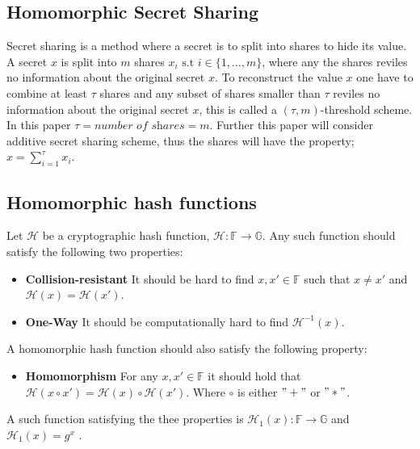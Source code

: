 \subsection*{Homomorphic Secret Sharing}
Secret sharing \cite{How_share_A_secret} is a method where a secret is to split  into shares to hide its value. A secret $x$ is split into $m$ shares $x_i \text{ s.t } i\in\{1,...,m\}$, where any the shares reviles no information about the original secret $x$. To reconstruct the value $x$ one have to combine at least $\tau$ shares and any subset of shares smaller than $\tau$ reviles no information about the original secret $x$, this is called a $(\tau,m)$-threshold scheme. In this paper $\tau = \textit{number of shares}=m$. Further this paper will consider additive secret sharing scheme, thus the shares will have the property; $x = \sum_{i=1}^\tau x_i$. 

\subsection*{Homomorphic hash functions}
Let $\mathcal{H}$ be a cryptographic hash function, $\mathcal{H}:\mathds{F}\to \mathds{G}$. Any such function should satisfy the following two properties:
\begin{itemize}
    \item \textbf{Collision-resistant} It should be hard to find $x,x'\in\mathds{F}$ such that $x\neq x'$ and $\mathcal{H}(x)=\mathcal{H}(x')$.
    \item \textbf{One-Way} It should be computationally hard to find $\mathcal{H}^{-1}(x)$.
\end{itemize}

A homomorphic hash function should also satisfy the following property:
\begin{itemize}
    \item \textbf{Homomorphism} For any $x,x'\in\mathds{F}$ it should hold that $\mathcal{H}(x\circ x') = \mathcal{H}(x)\circ\mathcal{H}(x')$. Where $\circ$ is either $"+"$ or $"*"$.
\end{itemize}

A such function satisfying the thee properties is $\mathcal{H}_1(x):\mathds{F}\to\mathds{G}$ and $\mathcal{H}_1(x)= g^{x}$ \cite{HHF}. 
